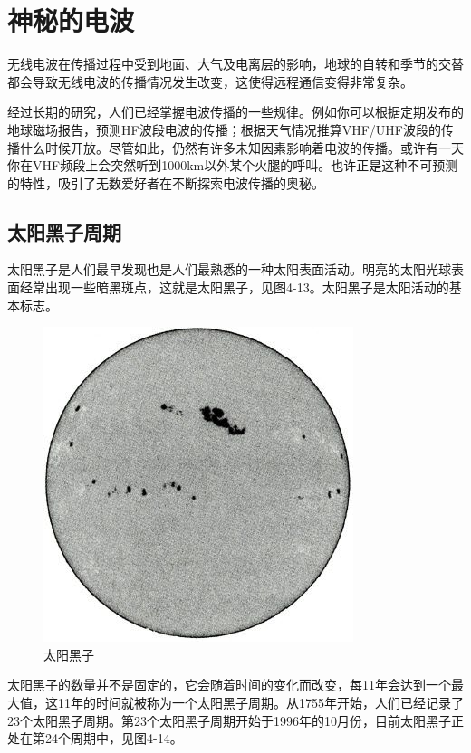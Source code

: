 \documentclass[12pt,UTF8]{ctexbook}
\begin{document}
\section{神秘的电波}

无线电波在传播过程中受到地面、大气及电离层的影响，地球的自转和季节的交替都会导致无线电波的传播情况发生改变，这使得远程通信变得非常复杂。

经过长期的研究，人们已经掌握电波传播的一些规律。例如你可以根据定期发布的地球磁场报告，预测HF波段电波的传播；根据天气情况推算VHF/UHF波段的传播什么时候开放。尽管如此，仍然有许多未知因素影响着电波的传播。或许有一天你在VHF频段上会突然听到1000km以外某个火腿的呼叫。也许正是这种不可预测的特性，吸引了无数爱好者在不断探索电波传播的奥秘。

\subsection{太阳黑子周期}

太阳黑子是人们最早发现也是人们最熟悉的一种太阳表面活动。明亮的太阳光球表面经常出现一些暗黑斑点，这就是太阳黑子，见图4-13。太阳黑子是太阳活动的基本标志。

\begin{figure}[htbp]
	\centering
	\includegraphics[width=0.7\linewidth]{56}
	\caption{太阳黑子}
	\label{fig:1}
\end{figure}

太阳黑子的数量并不是固定的，它会随着时间的变化而改变，每11年会达到一个最大值，这11年的时间就被称为一个太阳黑子周期。从1755年开始，人们已经记录了23个太阳黑子周期。第23个太阳黑子周期开始于1996年的10月份，目前太阳黑子正处在第24个周期中，见图4-14。
\end{document}
